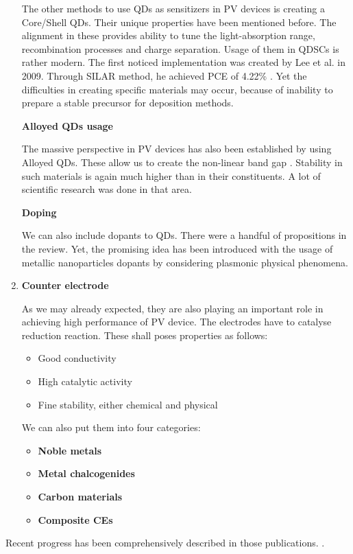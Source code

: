 \begin{enumerate}
The other methods to use QDs as sensitizers in PV devices is creating a
Core/Shell QDs. Their unique properties have been mentioned before. The
alignment in these provides ability to tune the light-absorption range,
recombination processes and charge separation. Usage of them in QDSCs is
rather modern. The first noticed implementation was created by Lee et
al. in 2009. Through SILAR method, he achieved PCE of 4.22\% \cite{Lee2009}. Yet the difficulties in creating specific materials may occur, because of inability to prepare a stable precursor for deposition methods. 

\textbf{Alloyed QDs usage}

The massive perspective in PV devices has also been established by using Alloyed QDs. These allow us to create the non-linear band gap \cite{Regulacio2010} . Stability in such materials is again much higher than in their constituents. A lot of scientific research was done in that area.

\textbf{Doping}

We can also include dopants to QDs. There were a handful of propositions in the \cite{HuashangRao2018} review. Yet, the promising idea has been introduced with the usage of metallic nanoparticles dopants by considering plasmonic physical phenomena.\cite{Kubo2015} \cite{YongjieWang2017}

\newpage
\item \textbf{ Counter electrode}

As we may already expected, they are also playing an important role in
achieving high performance of PV device. The electrodes have to catalyse
reduction reaction. These shall poses properties as follows:

\begin{itemize}
\item
  Good conductivity
\item
  High catalytic activity
\item
  Fine stability, either chemical and physical
\end{itemize}

We can also put them into four categories:

\begin{itemize}
\item
  \textbf{Noble metals}
\item
  \textbf{Metal chalcogenides}
\item
  \textbf{Carbon materials}
\item
  \textbf{Composite CEs}
\end{itemize}
\end{enumerate}
Recent progress has been comprehensively described in those publications.
\cite{Yang2017} \cite{HuashangRao2018} .